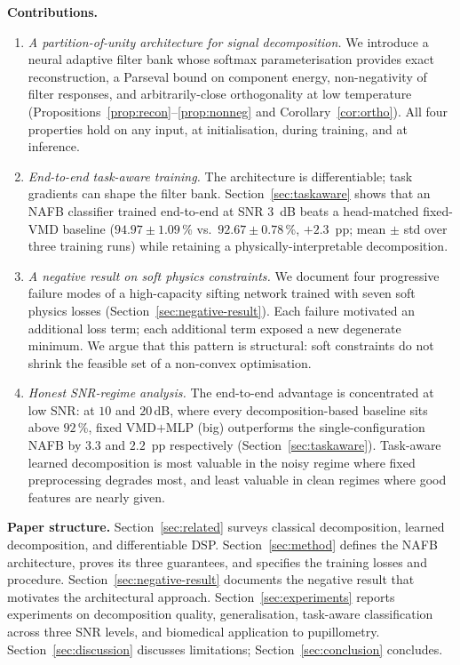 \documentclass[journal]{IEEEtran}
\theoremstyle{remark}
\begin{document}
\smallskip\noindent\textbf{Contributions.}
\begin{enumerate}
\item\emph{A partition-of-unity architecture for signal decomposition.}
  We introduce a neural adaptive filter bank whose softmax
  parameterisation provides exact reconstruction, a Parseval bound on
  component energy, non-negativity of filter responses, and
  arbitrarily-close orthogonality at low temperature
  (Propositions~\ref{prop:recon}--\ref{prop:nonneg} and
  Corollary~\ref{cor:ortho}). All four properties hold on any input,
  at initialisation, during training, and at inference.
\item\emph{End-to-end task-aware training.} The architecture is
  differentiable; task gradients can shape the filter bank.
  Section~\ref{sec:taskaware} shows that an NAFB classifier trained
  end-to-end at SNR $3$~dB beats a head-matched fixed-VMD baseline
  ($94.97 \pm 1.09$\,\% vs.\ $92.67 \pm 0.78$\,\%, $+2.3$~pp; mean
  $\pm$ std over three training runs) while retaining a
  physically-interpretable decomposition.
\item\emph{A negative result on soft physics constraints.} We document
  four progressive failure modes of a high-capacity sifting network
  trained with seven soft physics losses
  (Section~\ref{sec:negative-result}). Each failure motivated an
  additional loss term; each additional term exposed a new degenerate
  minimum. We argue that this pattern is structural: soft constraints
  do not shrink the feasible set of a non-convex optimisation.
\item\emph{Honest SNR-regime analysis.} The end-to-end advantage is
  concentrated at low SNR: at $10$ and $20$\,dB, where every
  decomposition-based baseline sits above $92$\,\%, fixed VMD$+$MLP
  (big) outperforms the single-configuration NAFB by $3.3$ and
  $2.2$~pp respectively (Section~\ref{sec:taskaware}). Task-aware
  learned decomposition is most valuable in the noisy regime where
  fixed preprocessing degrades most, and least valuable in clean
  regimes where good features are nearly given.
\end{enumerate}

\smallskip\noindent\textbf{Paper structure.}
Section~\ref{sec:related} surveys classical decomposition,
learned decomposition, and differentiable DSP.
Section~\ref{sec:method} defines the NAFB architecture, proves its
three guarantees, and specifies the training losses and procedure.
Section~\ref{sec:negative-result} documents the negative result that
motivates the architectural approach. Section~\ref{sec:experiments}
reports experiments on decomposition quality, generalisation,
task-aware classification across three SNR levels, and biomedical
application to pupillometry. Section~\ref{sec:discussion} discusses
limitations; Section~\ref{sec:conclusion} concludes.
\end{document}
